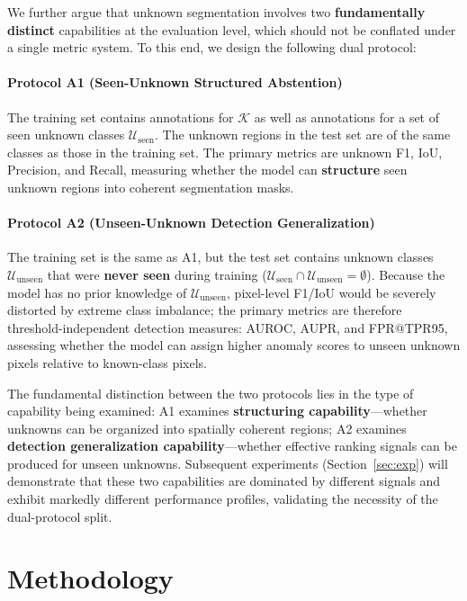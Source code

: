 \documentclass[journal]{IEEEtai}
\newcommand{\cK}{\mathcal{K}}
\newcommand{\cU}{\mathcal{U}}
\begin{document}
We further argue that unknown segmentation involves two \textbf{fundamentally distinct}
capabilities at the evaluation level, which should not be conflated under a single
metric system. To this end, we design the following dual protocol:

\paragraph{Protocol A1 (Seen-Unknown Structured Abstention)}
The training set contains annotations for $\cK$ as well as annotations for a set of
seen unknown classes $\cU_{\text{seen}}$.
The unknown regions in the test set are of the same classes as those in the training set.
The primary metrics are unknown F1, IoU, Precision, and Recall,
measuring whether the model can \textbf{structure} seen unknown regions into coherent
segmentation masks.

\paragraph{Protocol A2 (Unseen-Unknown Detection Generalization)}
The training set is the same as A1, but the test set contains unknown classes
$\cU_{\text{unseen}}$ that were \textbf{never seen} during training
($\cU_{\text{seen}} \cap \cU_{\text{unseen}} = \emptyset$).
Because the model has no prior knowledge of $\cU_{\text{unseen}}$,
pixel-level F1/IoU would be severely distorted by extreme class imbalance;
the primary metrics are therefore threshold-independent detection measures:
AUROC, AUPR, and FPR@TPR95, assessing whether the model can assign higher
anomaly scores to unseen unknown pixels relative to known-class pixels.

The fundamental distinction between the two protocols lies in the type of capability
being examined:
A1 examines \textbf{structuring capability}---whether unknowns can be organized into
spatially coherent regions;
A2 examines \textbf{detection generalization capability}---whether effective ranking
signals can be produced for unseen unknowns.
Subsequent experiments (Section~\ref{sec:exp}) will demonstrate that these two
capabilities are dominated by different signals and exhibit markedly different
performance profiles, validating the necessity of the dual-protocol split.


\section{Methodology}\label{sec:method}
\end{document}
